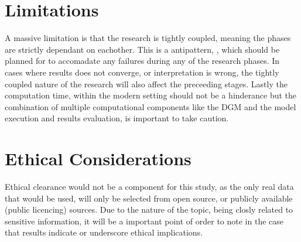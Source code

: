 \section{Limitations}
A massive limitation is that the research is tightly coupled, meaning the phases are strictly dependant on eachother. This is a antipattern, \parencite{joshi_beginning_2016}, which should be planned for to accomadate any failures during any of the research phases. In cases where results does not converge, or interpretation is wrong, the tightly coupled nature of the research will also affect the preceeding stages. Lastly the computation time, within the modern setting should not be a hinderance but the combination of multiple computational components like the DGM and the model execution and results evaluation, is important to take caution. 

\section{Ethical Considerations}
Ethical clearance would not be a component for this study, as the only real data that would be used, will only be selected from open source, or publicly available (public licencing) sources. Due to the nature of the topic, being closly related to sensitive information, it will be a important point of order to note in the case that results indicate or underscore ethical implications.


